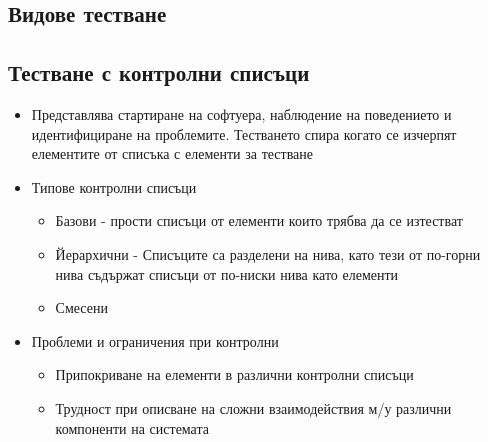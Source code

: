 \documentclass[fleqn,12pt]{article}
\begin{document}
\begin{flushleft}
\section{Видове тестване}
\subsection{Тестване с контролни списъци}
    \begin{itemize}
        \item Представлява стартиране на софтуера, наблюдение на поведението и идентифициране на проблемите. Тестването спира когато се изчерпят елементите от списъка с елементи за тестване
        \item Типове контролни списъци
        \begin{itemize}
            \item Базови - прости списъци от елементи които трябва да се изтестват
            \item Йерархични - Списъците са разделени на нива, като тези от по-горни нива съдържат списъци от по-ниски нива като елементи
            \item Смесени
        \end{itemize}
        \item Проблеми и ограничения при контролни
        \begin{itemize}
            \item Припокриване на елементи в различни контролни списъци
            \item Трудност при описване на сложни взаимодействия м/у различни компоненти на системата
        \end{itemize}
    \end{itemize}


\end{flushleft}
\end{document}
